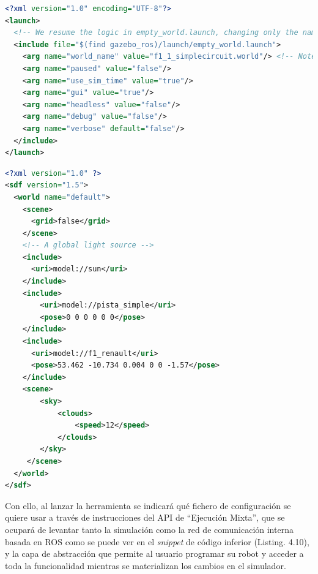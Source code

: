 \begin{lstlisting}[language=XML, caption=Configuración de Lanzamiento de Simulaciones]
<?xml version="1.0" encoding="UTF-8"?>
<launch>
  <!-- We resume the logic in empty_world.launch, changing only the name of the world to be launched -->
  <include file="$(find gazebo_ros)/launch/empty_world.launch">
    <arg name="world_name" value="f1_1_simplecircuit.world"/> <!-- Note: the world_name is with respect to GAZEBO_RESOURCE_PATH environmental variable -->
    <arg name="paused" value="false"/>
    <arg name="use_sim_time" value="true"/>
    <arg name="gui" value="true"/>
    <arg name="headless" value="false"/>
    <arg name="debug" value="false"/>
    <arg name="verbose" default="false"/>
  </include>  
</launch>
\end{lstlisting}

\begin{lstlisting}[language=XML, caption=Configuración de Lanzamiento de Simulaciones]
<?xml version="1.0" ?>
<sdf version="1.5">
  <world name="default">
    <scene>
      <grid>false</grid>
    </scene>
    <!-- A global light source -->
    <include>
      <uri>model://sun</uri>
    </include>
    <include>
	    <uri>model://pista_simple</uri>
	    <pose>0 0 0 0 0 0</pose>
    </include>
    <include>
      <uri>model://f1_renault</uri>
      <pose>53.462 -10.734 0.004 0 0 -1.57</pose>
    </include>
    <scene>
        <sky>
            <clouds>
                <speed>12</speed>
            </clouds>
        </sky>
     </scene>
  </world>
</sdf>
\end{lstlisting}

Con ello, al lanzar la herramienta se indicará qué fichero de configuración se quiere usar a través de instrucciones del API de ``Ejecución Mixta'', que se ocupará de levantar tanto la simulación como la red de comunicación interna basada en ROS como se puede ver en el \textit{snippet} de código inferior (Listing. 4.10), y la capa de abstracción que permite al usuario programar su robot y acceder a toda la funcionalidad mientras se materializan los cambios en el simulador.

